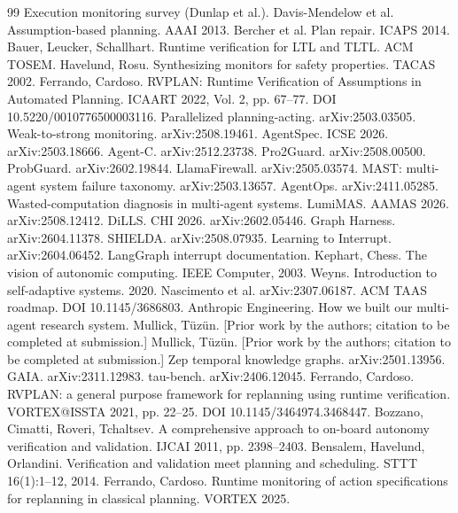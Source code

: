 \documentclass[acmsmall,screen]{acmart}
\begin{document}
\begin{thebibliography}{99}
 Execution monitoring survey (Dunlap et al.).
 Davis-Mendelow et al. Assumption-based planning. AAAI 2013.
 Bercher et al. Plan repair. ICAPS 2014.
 Bauer, Leucker, Schallhart. Runtime verification for LTL and TLTL. ACM TOSEM.
 Havelund, Rosu. Synthesizing monitors for safety properties. TACAS 2002.
 Ferrando, Cardoso. RVPLAN: Runtime Verification of Assumptions in Automated Planning. ICAART 2022, Vol. 2, pp. 67--77. DOI 10.5220/0010776500003116.
 Parallelized planning-acting. arXiv:2503.03505.
 Weak-to-strong monitoring. arXiv:2508.19461.
 AgentSpec. ICSE 2026. arXiv:2503.18666.
 Agent-C. arXiv:2512.23738.
 Pro2Guard. arXiv:2508.00500.
 ProbGuard. arXiv:2602.19844.
 LlamaFirewall. arXiv:2505.03574.
 MAST: multi-agent system failure taxonomy. arXiv:2503.13657.
 AgentOps. arXiv:2411.05285.
 Wasted-computation diagnosis in multi-agent systems.
 LumiMAS. AAMAS 2026. arXiv:2508.12412.
 DiLLS. CHI 2026. arXiv:2602.05446.
 Graph Harness. arXiv:2604.11378.
 SHIELDA. arXiv:2508.07935.
 Learning to Interrupt. arXiv:2604.06452.
 LangGraph interrupt documentation.
 Kephart, Chess. The vision of autonomic computing. IEEE Computer, 2003.
 Weyns. Introduction to self-adaptive systems. 2020.
 Nascimento et al. arXiv:2307.06187.
 ACM TAAS roadmap. DOI 10.1145/3686803.
 Anthropic Engineering. How we built our multi-agent research system.
 Mullick, T\"uz\"un. [Prior work by the authors; citation to be completed at submission.]
 Mullick, T\"uz\"un. [Prior work by the authors; citation to be completed at submission.]
 Zep temporal knowledge graphs. arXiv:2501.13956.
 GAIA. arXiv:2311.12983.
 tau-bench. arXiv:2406.12045.
 Ferrando, Cardoso. RVPLAN: a general purpose framework for replanning using runtime verification. VORTEX@ISSTA 2021, pp. 22--25. DOI 10.1145/3464974.3468447.
 Bozzano, Cimatti, Roveri, Tchaltsev. A comprehensive approach to on-board autonomy verification and validation. IJCAI 2011, pp. 2398--2403.
 Bensalem, Havelund, Orlandini. Verification and validation meet planning and scheduling. STTT 16(1):1--12, 2014.
 Ferrando, Cardoso. Runtime monitoring of action specifications for replanning in classical planning. VORTEX 2025.
\end{thebibliography}
\end{document}
